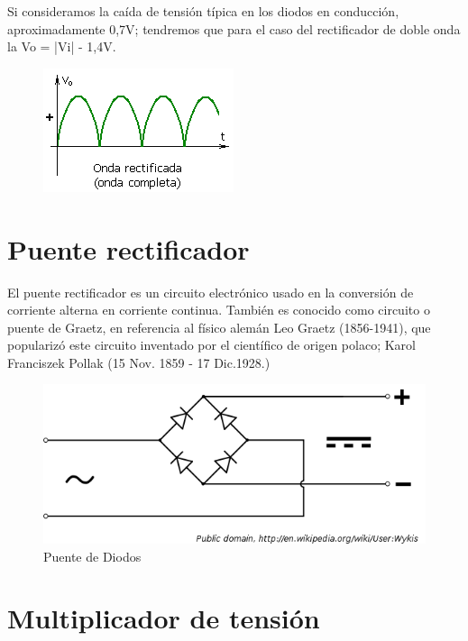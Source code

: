 \documentclass{article}
\begin{document}
   

Si consideramos la caída de tensión típica en los diodos en conducción, aproximadamente 0,7V; tendremos que para el caso del rectificador de doble onda la Vo = |Vi| - 1,4V.\citep{circuitoOnda}\\


\begin{figure}[h!]
    \centering
    \includegraphics[scale=0.8]{OndaCompleta.png}
    \label{fig:my_label}
\end{figure}

\section{Puente rectificador}

El puente rectificador es un circuito electrónico usado en la conversión de corriente alterna en corriente continua. También es conocido como circuito o puente de Graetz, en referencia al físico alemán Leo Graetz (1856-1941), que popularizó este circuito inventado por el científico de origen polaco; Karol Franciszek Pollak (15 Nov. 1859 - 17 Dic.1928.)\citep{puente}



\begin{figure}[h!]
    \centering
    \includegraphics[scale=0.5]{PuenteDiodos.png}
    \caption{Puente de Diodos}
    \label{fig:puente de diodos}
\end{figure}

\section{Multiplicador de tensión}
\end{document}
